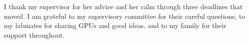 I thank my supervisor for her advice and her calm through three deadlines that moved. I am
grateful to my supervisory committee for their careful questions, to my labmates for sharing
GPUs and good ideas, and to my family for their support throughout.
